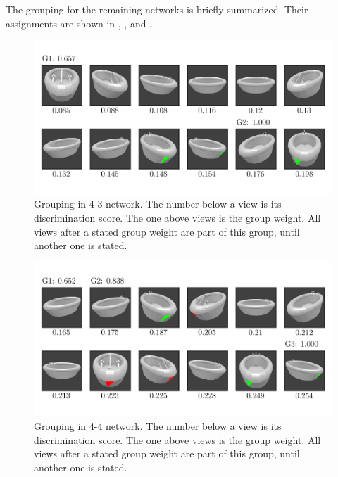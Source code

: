 The grouping for the remaining networks is briefly summarized.
Their assignments are shown in , ,  and .
\begin{figure}
	\centering
	\includegraphics[trim=10 20 10 20, clip]{images/mn-sl-4-3-20/bathtub_0107_1_grouping.png}
	\caption[Grouping in 4-3 network]{Grouping in 4-3 network. The number below a view is its discrimination score. The one above views is the group weight. All views after a stated group weight are part of this group, until another one is stated.}
	\label{fig:grouping-4-3}
\end{figure}
\begin{figure}
	\centering
	\includegraphics[trim=10 20 10 20, clip]{images/mn-sl-4-4-20/bathtub_0107_3_grouping.png}
	\caption[Grouping in 4-4 network]{Grouping in 4-4 network. The number below a view is its discrimination score. The one above views is the group weight. All views after a stated group weight are part of this group, until another one is stated.}
	\label{fig:grouping-4-4}
\end{figure}
